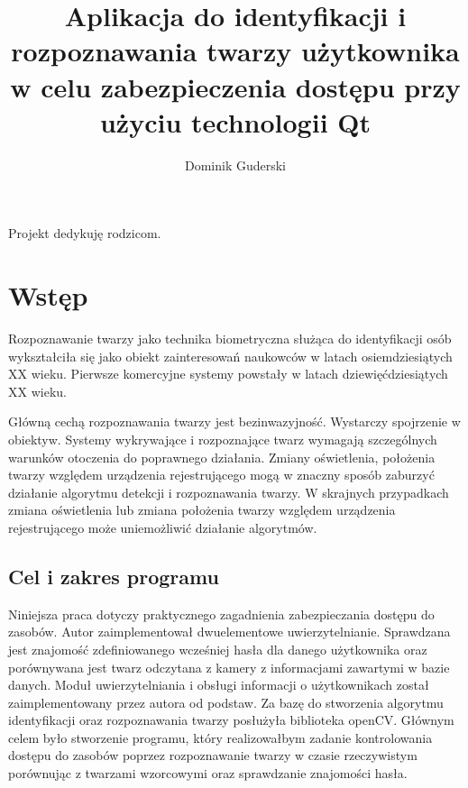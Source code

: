 \documentclass[eng,printmode]{mgr}
\title{Aplikacja do identyfikacji i rozpoznawania twarzy użytkownika w celu zabezpieczenia dostępu przy użyciu technologii Qt}
\author{Dominik Guderski}
\begin{document}

\maketitle %
\dedication{6cm}{Projekt dedykuję rodzicom.}

\tableofcontents %


\chapter{Wstęp}
Rozpoznawanie twarzy jako technika biometryczna służąca do identyfikacji osób wykształciła się jako obiekt zainteresowań naukowców w latach osiemdziesiątych XX wieku. Pierwsze komercyjne systemy powstały w latach dziewięćdziesiątych XX wieku.\cite{historyreco}

Główną cechą rozpoznawania twarzy jest bezinwazyjność. Wystarczy spojrzenie w obiektyw. Systemy wykrywające i rozpoznające twarz wymagają szczególnych warunków otoczenia do poprawnego działania. Zmiany oświetlenia, położenia twarzy względem urządzenia rejestrującego mogą w znaczny sposób zaburzyć działanie algorytmu detekcji i rozpoznawania twarzy. W skrajnych przypadkach zmiana oświetlenia lub zmiana położenia twarzy względem urządzenia rejestrującego może uniemożliwić działanie algorytmów.
\section{Cel i zakres programu}
Niniejsza praca dotyczy praktycznego zagadnienia zabezpieczania dostępu do zasobów. Autor zaimplementował dwuelementowe uwierzytelnianie. Sprawdzana jest znajomość zdefiniowanego wcześniej hasła dla danego użytkownika oraz porównywana jest twarz odczytana z kamery z informacjami zawartymi w bazie danych. Moduł uwierzytelniania i obsługi informacji o użytkownikach został zaimplementowany przez autora od podstaw. Za bazę do stworzenia algorytmu identyfikacji oraz rozpoznawania twarzy posłużyła biblioteka openCV. Głównym celem było stworzenie programu, który realizowałbym zadanie kontrolowania dostępu do zasobów poprzez rozpoznawanie twarzy w czasie rzeczywistym porównując z twarzami wzorcowymi oraz sprawdzanie znajomości hasła.
\end{document}
